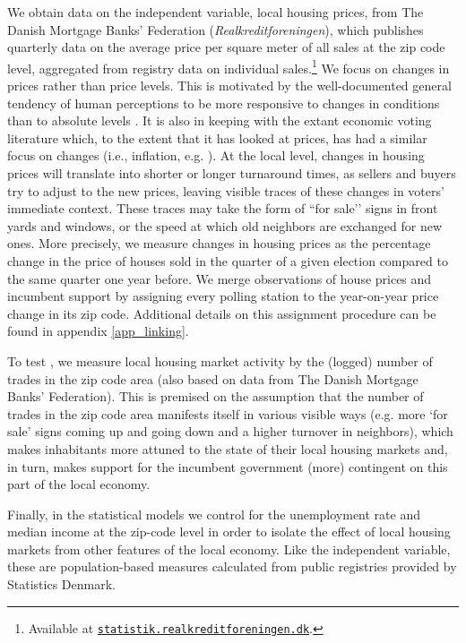 \documentclass[12pt,a4paper]{article}
\begin{document}
	We obtain data on the independent variable, local housing prices, from The Danish Mortgage Banks' Federation (\textit{Realkreditforeningen}), which publishes quarterly data on the average price per square meter of all sales at the zip code level, aggregated from registry data on individual sales.\footnote{Available at \texttt{\href{http://statistik.realkreditforeningen.dk/}{statistik.realkreditforeningen.dk}}.} We focus on changes in prices rather than price levels. This is motivated by the well-documented general tendency of human perceptions to be more responsive to changes in conditions than to absolute levels \citep{kahneman1979prospect}. It is also in keeping with the extant economic voting literature which, to the extent that it has looked at prices, has had a similar focus on changes (i.e., inflation, e.g. \citealp{kramer1971short}). At the local level, changes in housing prices will translate into shorter or longer turnaround times, as sellers and buyers try to adjust to the new prices, leaving visible traces of these changes in voters’ immediate context. These traces may take the form of ``for sale’’ signs in front yards and windows, or the speed at which old neighbors are exchanged for new ones. More precisely, we measure changes in housing prices as the percentage change in the price of houses sold in the quarter of a given election compared to the same quarter one year before. We merge observations of house prices and incumbent support by assigning every polling station to the year-on-year price change in its zip code. Additional details on this assignment procedure can be found in appendix \ref{app_linking}.
	
	To test \htwo, we measure local housing market activity by the (logged) number of trades in the zip code area (also based on data from The Danish Mortgage Banks' Federation). This is premised on the assumption that the number of trades in the zip code area manifests itself in various visible ways (e.g. more ‘for sale’ signs coming up and going down and a higher turnover in neighbors), which makes inhabitants more attuned to the state of their local housing markets and, in turn, makes support for the incumbent government (more) contingent on this part of the local economy.
	
	Finally, in the statistical models we control for the unemployment rate and median income at the zip-code level in order to isolate the effect of local housing markets from other features of the local economy. Like the independent variable, these are population-based measures calculated from public registries provided by Statistics Denmark.
	
\end{document}
